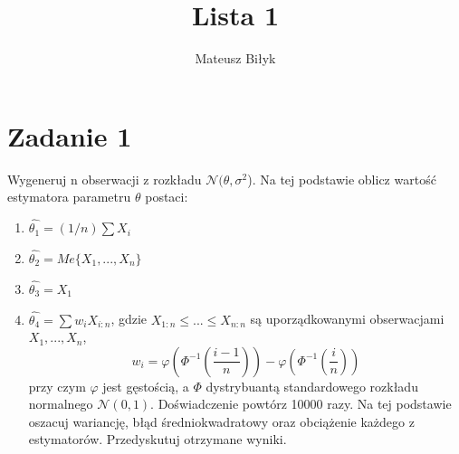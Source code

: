 \documentclass{memoir}
\title{Lista 1}
\author{Mateusz Biłyk}
\begin{document}
\maketitle
\section*{Zadanie 1}
Wygeneruj n obserwacji z rozkładu $\mathcal{N}(\theta,\sigma^2$). Na tej podstawie oblicz wartość estymatora parametru $\theta$ postaci:
\begin{enumerate}
	\item $\hat{\theta_1}=(1/n)\sum X_i$
	\item $\hat{\theta_2}=Me\{X_1,...,X_n\}$
	\item $\hat{\theta_3}=X_1$
	\item $\hat{\theta_4}=\sum w_i X_{i:n}$, gdzie $X_{1:n}\leq ... \leq X_{n:n}$ 
są uporządkowanymi obserwacjami  
	$X_1,...,X_n$, $$w_i= \varphi \left( \Phi^{-1} \left( \frac{i-1}{n} \right) \right) - \varphi \left( \Phi^{-1} \left( \frac{i}{n} \right) \right)$$
	przy czym $\varphi$ jest gęstością, a $\Phi$ dystrybuantą standardowego rozkładu normalnego $\mathcal{N}(0,1)$.
	Doświadczenie powtórz 10000 razy. Na tej podstawie oszacuj wariancję, błąd średniokwadratowy oraz obciążenie każdego z estymatorów. Przedyskutuj otrzymane wyniki.
\end{enumerate}
\end{document}
